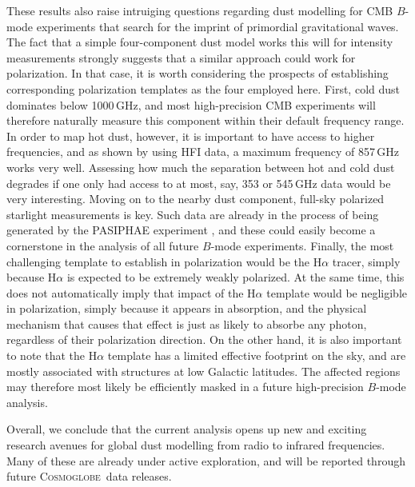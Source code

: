 \documentclass{aa}
\def\Cosmoglobe{\textsc{Cosmoglobe}}
\begin{document}
These results also raise intruiging questions regarding dust modelling
for CMB $B$-mode experiments that search for the imprint of primordial
gravitational waves. The fact that a simple four-component dust model
works this will for intensity measurements strongly suggests that a
similar approach could work for polarization. In that case, it is
worth considering the prospects of establishing corresponding
polarization templates as the four employed here. First, cold dust
dominates below 1000\,GHz, and most high-precision CMB experiments
will therefore naturally measure this component within their default
frequency range. In order to map hot dust, however, it is important to
have access to higher frequencies, and as shown by \citep{CG02_06}
using HFI data, a maximum frequency of 857\,GHz works very
well. Assessing how much the separation between hot and cold dust
degrades if one only had access to at most, say, 353 or 545\,GHz data
would be very interesting. Moving on to the nearby dust component,
full-sky polarized starlight measurements is key. Such data are
already in the process of being generated by the PASIPHAE experiment
\citep{tassis:2018}, and these could easily become a cornerstone in
the analysis of all future $B$-mode experiments. Finally, the most
challenging template to establish in polarization would be the
H$\alpha$ tracer, simply because H$\alpha$ is expected to be extremely
weakly polarized. At the same time, this does not automatically imply
that impact of the H$\alpha$ template would be negligible in
polarization, simply because it appears in absorption, and the
physical mechanism that causes that effect is just as likely to
absorbe any photon, regardless of their polarization direction. On the
other hand, it is also important to note that the H$\alpha$ template
has a limited effective footprint on the sky, and are mostly
associated with structures at low Galactic latitudes. The affected
regions may therefore most likely be efficiently masked in a future
high-precision $B$-mode analysis.

Overall, we conclude that the current analysis opens up new and
exciting research avenues for global dust modelling from radio to
infrared frequencies. Many of these are already under active
exploration, and will be reported through future \Cosmoglobe\ data
releases.
\end{document}
